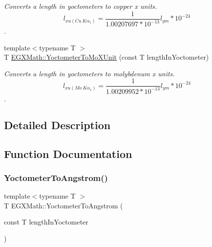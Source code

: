 \begin{DoxyCompactItemize}
\begin{DoxyCompactList}\small\item\em Converts a length in yoctometers to copper x units. \[ l_{xu(Cu\ K\alpha_1)}= \frac{1}{1.00207697*10^{-13}} l_{ym} * 10^{-24}\]. \end{DoxyCompactList}\item 
{\footnotesize template$<$typename T $>$ }\\T \mbox{\hyperlink{group___e_g_x_math-_conversions-_length_conversions-_s_i-_yoctometer-_non-_s_i_ga6a6a1fb3ecc97e377fc728c03327048e}{E\+G\+X\+Math\+::\+Yoctometer\+To\+Mo\+X\+Unit}} (const T length\+In\+Yoctometer)
\begin{DoxyCompactList}\small\item\em Converts a length in yoctometers to molybdenum x units. \[ l_{xu(Mo\ K\alpha_1)}=\frac{1}{1.00209952*10^{-13}} l_{ym} * 10^{-24}\]. \end{DoxyCompactList}\end{DoxyCompactItemize}


\subsection{Detailed Description}


\subsection{Function Documentation}
\mbox{\label{group___e_g_x_math-_conversions-_length_conversions-_s_i-_yoctometer-_non-_s_i_ga1189896c419175e90e23cea9d8f6b52a}} 
\subsubsection{\texorpdfstring{Yoctometer\+To\+Angstrom()}{YoctometerToAngstrom()}}
{\footnotesize\ttfamily template$<$typename T $>$ \\
T E\+G\+X\+Math\+::\+Yoctometer\+To\+Angstrom (\begin{DoxyParamCaption}\item[{const T}]{length\+In\+Yoctometer }\end{DoxyParamCaption})}



